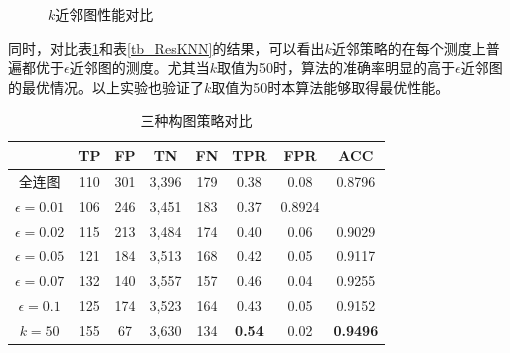 \begin{figure}[!ht]
\centering
{}
\caption{$k$近邻图性能对比}
\label{fig_ReskNN}
\end{figure}

同时，对比表\ref{tb_ResGraph}和表\ref{tb_ResKNN}的结果，可以看出$k$近邻策略的在每个测度上普遍都优于$\epsilon$近邻图的测度。尤其当$k$取值为50时，算法的准确率明显的高于$\epsilon$近邻图的最优情况。以上实验也验证了$k$取值为50时本算法能够取得最优性能。

\begin{table}[!ht]
\renewcommand{\arraystretch}{1.5}
\caption{三种构图策略对比}
\label{tb_ResGraph}
\centering
\begin{tabular}{cccccccc}
\toprule
 & TP & FP & TN & FN & TPR & FPR & ACC\\
\midrule
全连图 & 110 & 301 & 3,396 & 179 & 0.38 & 0.08 & 0.8796 \\
$\epsilon=0.01$ & 106 & 246 & 3,451 & 183 & 0.37 & 0.8924 \\
$\epsilon=0.02$ & 115 & 213 & 3,484 & 174 & 0.40 & 0.06 & 0.9029 \\
$\epsilon=0.05$ & 121 & 184 & 3,513 & 168 & 0.42 & 0.05 & 0.9117 \\
$\epsilon=0.07$ & 132 & 140 & 3,557 & 157 & 0.46 & 0.04 & 0.9255 \\
$\epsilon=0.1$ & 125 & 174 & 3,523 & 164 & 0.43 & 0.05 & 0.9152\\
$k=50$ & 155 & 67 & 3,630 & 134 & \textbf{0.54} & 0.02 & \textbf{0.9496}\\
\bottomrule
\end{tabular}
\end{table}


